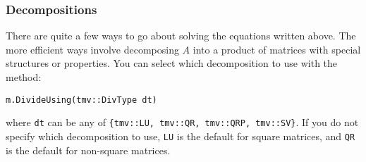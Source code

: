 \documentclass[twoside,letterpaper,11pt]{article}
\renewcommand{\tt}[1]{{\texttt {#1}}}
\begin{document}
\subsubsection{Decompositions}
\label{divtypes}

There are quite a few ways to go about solving the equations written above.  
The more efficient ways involve decomposing $A$ into a product of
matrices with special structures or properties.  
You can select which decomposition to use with the method:
\begin{verbatim}
m.DivideUsing(tmv::DivType dt)
\end{verbatim}
where \tt{dt} can be any of \tt{\{tmv::LU, tmv::QR, tmv::QRP, tmv::SV\}}.
If you do not specify which decomposition to use, \tt{LU} is the 
default for square matrices, and \tt{QR} is the default for
non-square matrices.
\end{document}
